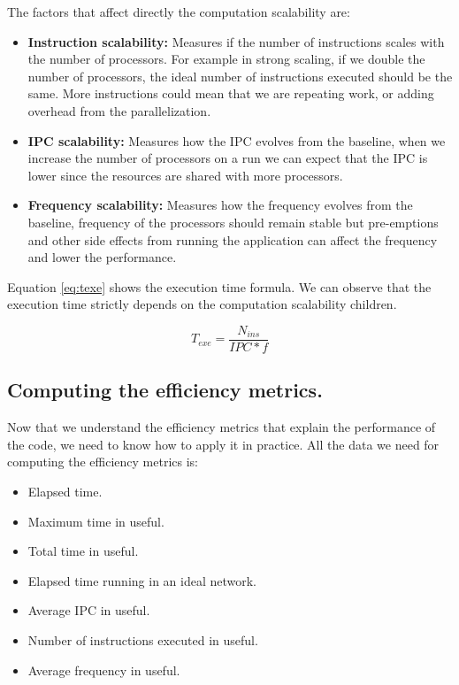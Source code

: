 The factors that affect directly the computation scalability are:
\begin{itemize}
  \item \textbf{Instruction scalability:} Measures if the number of instructions scales with the number of processors. For example in strong scaling, if we double the number of processors, the ideal number of instructions executed should be the same. More instructions could mean that we are repeating work, or adding overhead from the parallelization.

  \item \textbf{IPC scalability:} Measures how the IPC evolves from the baseline, when we increase the number of processors on a run we can expect that the IPC is lower since the resources are shared with more processors. 

  \item \textbf{Frequency scalability:} Measures how the frequency evolves from the baseline, frequency of the processors should remain stable but pre-emptions and other side effects from running the application can affect the frequency and lower the performance.
\end{itemize}

Equation \ref{eq:texe} shows the execution time formula. We can observe that the execution time strictly depends on the computation scalability children.

\begin{equation}\label{eq:texe}
  T_{exe}=\frac{N_{ins}}{IPC\ast f}
\end{equation}

\subsection{Computing the efficiency metrics.}

Now that we understand the efficiency metrics that explain the performance of the code, we need to know how to apply it in practice. All the data we need for computing the efficiency metrics is:
\begin{itemize}
  \item Elapsed time.
  \item Maximum time in useful.
  \item Total time in useful.
  \item Elapsed time running in an ideal network.
  \item Average IPC in useful.
  \item Number of instructions executed in useful.
  \item Average frequency in useful.
\end{itemize}

